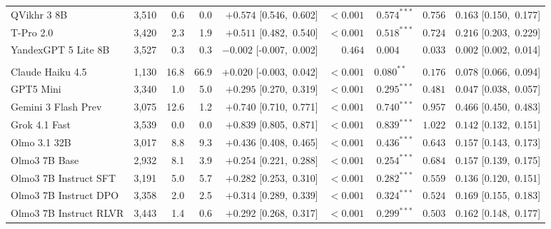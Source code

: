 \begin{table}[t]
{\begin{tabular}{l r r r r r r r r}
QVikhr 3 8B & 3,510 & 0.6 & 0.0 & $+0.574$ [0.546,\ 0.602] & $<\!0.001$ & $0.574^{***}$ & $0.756$ & $0.163$ [0.150,\ 0.177] \\
T-Pro 2.0 & 3,420 & 2.3 & 1.9 & $+0.511$ [0.482,\ 0.540] & $<\!0.001$ & $0.518^{***}$ & $0.724$ & $0.216$ [0.203,\ 0.229] \\
YandexGPT 5 Lite 8B & 3,527 & 0.3 & 0.3 & $-0.002$ [-0.007,\ 0.002] & $0.464$ & $0.004^{\phantom{***}}$ & $0.033$ & $0.002$ [0.002,\ 0.014] \\
\midrule
\addlinespace[3pt]
\multicolumn{9}{l}{\textit{\small USA}}\\
\addlinespace[1pt]
Claude Haiku 4.5 & 1,130 & 16.8 & 66.9 & $+0.020$ [-0.003,\ 0.042] & $<\!0.001$ & $0.080^{**\phantom{*}}$ & $0.176$ & $0.078$ [0.066,\ 0.094] \\
GPT5 Mini & 3,340 & 1.0 & 5.0 & $+0.295$ [0.270,\ 0.319] & $<\!0.001$ & $0.295^{***}$ & $0.481$ & $0.047$ [0.038,\ 0.057] \\
Gemini 3 Flash Prev & 3,075 & 12.6 & 1.2 & $+0.740$ [0.710,\ 0.771] & $<\!0.001$ & $0.740^{***}$ & $0.957$ & $0.466$ [0.450,\ 0.483] \\
Grok 4.1 Fast & 3,539 & 0.0 & 0.0 & $+0.839$ [0.805,\ 0.871] & $<\!0.001$ & $0.839^{***}$ & $1.022$ & $0.142$ [0.132,\ 0.151] \\
Olmo 3.1 32B & 3,017 & 8.8 & 9.3 & $+0.436$ [0.408,\ 0.465] & $<\!0.001$ & $0.436^{***}$ & $0.643$ & $0.157$ [0.143,\ 0.173] \\
Olmo3 7B Base & 2,932 & 8.1 & 3.9 & $+0.254$ [0.221,\ 0.288] & $<\!0.001$ & $0.254^{***}$ & $0.684$ & $0.157$ [0.139,\ 0.175] \\
Olmo3 7B Instruct SFT & 3,191 & 5.0 & 5.7 & $+0.282$ [0.253,\ 0.310] & $<\!0.001$ & $0.282^{***}$ & $0.559$ & $0.136$ [0.120,\ 0.151] \\
Olmo3 7B Instruct DPO & 3,358 & 2.0 & 2.5 & $+0.314$ [0.289,\ 0.339] & $<\!0.001$ & $0.324^{***}$ & $0.524$ & $0.169$ [0.155,\ 0.183] \\
Olmo3 7B Instruct RLVR & 3,443 & 1.4 & 0.6 & $+0.292$ [0.268,\ 0.317] & $<\!0.001$ & $0.299^{***}$ & $0.503$ & $0.162$ [0.148,\ 0.177] \\
\bottomrule
\end{tabular}%
}
\end{table}